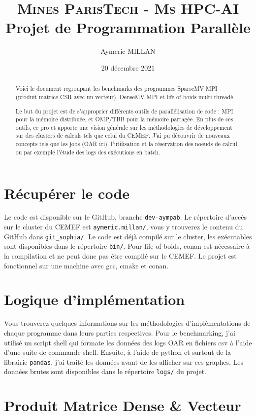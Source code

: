\documentclass[10pt,twocolumn,letterpaper]{article}
\title{
		\usefont{OT1}{bch}{b}{n}
		\normalfont \normalsize \textsc{Mines ParisTech - Ms HPC-AI} \\ [10pt]
		\huge Projet de Programmation Parallèle \\
}
\author{Aymeric MILLAN}
\affil{Cours de Jean-Marc GRATIEN}
\date{20 décembre 2021}
\def\code#1{\texttt{#1}}
\begin{document}
\maketitle

\begin{abstract}
Voici le document regroupant les benchmarks des programmes 
SparseMV MPI (produit matrice CSR avec un vecteur), 
DenseMV MPI 
et life of boids multi threadé.

Le but du projet est de s'approprier différents outils de parallélisation de code : MPI pour la mémoire distribuée, et OMP/TBB pour la mémoire partagée. 
En plus de ces outils, ce projet apporte une vision générale sur les méthodologies de développement sur des clusters de calculs tels que celui du CEMEF. 
J'ai pu découvrir de nouveaux concepts tels que les jobs (OAR ici), 
l'utilisation et la réservation des noeuds de calcul ou par exemple l'étude des logs des exécutions en batch. 
\end{abstract}

\section{Récupérer le code}
Le code est disponible sur le GitHub, branche \code{dev-aympab}. 
Le répertoire d'accès sur le cluster du CEMEF est \code{aymeric.millan/}, vous y trouverez le contenu du GitHub dans \code{git\_sophia/}.
Le code est déjà compilé sur le cluster, les exécutables sont disponibles dans le répertoire \code{bin/}.
Pour life-of-boids, conan est nécessaire à la compilation et ne peut donc pas être compilé sur le CEMEF. 
Le projet est fonctionnel sur une machine avec gcc, cmake et conan.

\section{Logique d'implémentation}

Vous trouverez quelques informations sur les méthodologies d'implémentations de chaque programme dans leurs parties respectives.
Pour le benchmarking, j'ai utilisé un script shell qui formate les données des logs OAR en fichiers csv à l'aide d'une suite de commande shell.
Ensuite, à l'aide de python et surtout de la librairie \code{pandas}, j'ai traité les données avant de les afficher sur ces graphes.
Les données brutes sont disponibles dans le répertoire \code{logs/} du projet.

\section{Produit Matrice Dense \& Vecteur}
\end{document}
